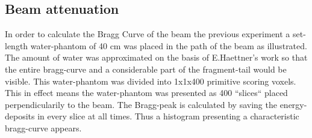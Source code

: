 \subsection{Beam attenuation}

In order to calculate the Bragg Curve of the beam the previous experiment a set-length water-phantom of 40 cm was placed in the path of the beam as illustrated. The amount of water was approximated on the basis of E.Haettner's work so that the entire bragg-curve and a considerable part of the fragment-tail would be visible. This water-phantom was divided into 1x1x400 primitive scoring voxels. This in effect means the water-phantom was presented as 400 ``slices`` placed perpendicularily to the beam. The Bragg-peak is calculated by saving the energy-deposits in every slice at all times. Thus a histogram presenting a characteristic bragg-curve appears.

